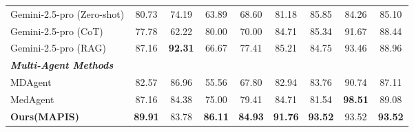 \begin{table}[!t]
{\begin{tabular}{@{}l|cccc|cccc@{}}
Gemini-2.5-pro (Zero-shot) & 80.73 & 74.19 & 63.89 & 68.60 & 81.18 & 85.85 & 84.26 & 85.10 \\
Gemini-2.5-pro (CoT) & 77.78 & 62.22 & 80.00 & 70.00  & 84.71 & 85.34 & 91.67 & 88.44 \\
Gemini-2.5-pro (RAG) & 87.16 & \textbf{92.31} & 66.67 & 77.41 & 85.21 & 84.75 & 93.46 & 88.96 \\
\midrule
\multicolumn{9}{l}{\textit{\textbf{Multi-Agent Methods}}} \\
MDAgent & 82.57 & 86.96 & 55.56 & 67.80 & 82.94 & 83.76 & 90.74 & 87.11 \\
MedAgent & 87.16 & 84.38 & 75.00 & 79.41 & 84.71 & 81.54 & \textbf{98.51} & 89.08 \\
\midrule
\textbf{Ours(MAPIS)}& 
\textbf{89.91} & 
83.78 & 
\textbf{86.11} & 
\textbf{84.93} & 
\textbf{91.76} & 
\textbf{93.52} & 
93.52 & 
\textbf{93.52} \\
\bottomrule
\end{tabular}
}
\end{table}